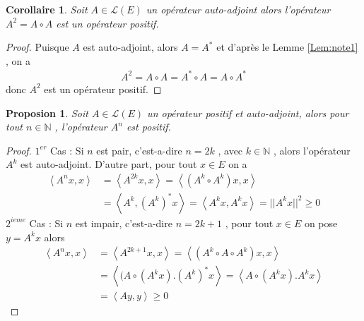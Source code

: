 \documentclass{report}
\newtheorem{Prop}{Proposion}[subsection]
\newtheorem{Cor}{Corollaire}[subsection]
\begin{document}
{\begin{Cor} Soit $A \in \mathscr{L}(E)$ un opérateur auto-adjoint alors l'opérateur $A^2 = A\circ A$ est un opérateur positif.\\
\end{Cor}
\begin{proof}


Puisque $A$ est auto-adjoint, alors $A = A^*$ et d'après le Lemme \ref{Lem:note1} , on a 
					\begin{align*}
					 A^2 = A \circ A = A^* \circ A = A\circ A^* 
					\end{align*}
donc $A^2$ est un opérateur positif.
\end{proof}


\begin{Prop} Soit $A \in \mathscr{L}(E)$ un opérateur positif et auto-adjoint, alors pour tout $n \in \mathbb{N}$ , l'opérateur $A^n$ est positif.\\
\end{Prop}
\begin{proof}
$1^{er}$ Cas : Si $n$ est pair, c'est-a-dire $n = 2k$ , avec $k \in \mathbb{N}$ , alors l'opérateur $A^k$ est auto-adjoint. D'autre part, pour tout $x \in E$ on a 
 					\begin{align*}
					 \left< A^nx,x \right> &= \left< A^{2k}x,x \right> = \left< (A^k\circ A^k)x,x \right> \\
					 &= \left< A^k,(A^k)^*x \right> = \left< A^kx,A^kx \right> = ||A^kx||^2 \ge 0
					\end{align*}
 $2^{ieme}$ Cas : Si $n$ est impair, c'est-a-dire $n = 2k + 1$ , pour tout $x \in E$ on pose $y = A^k x$ alors 
 					\begin{align*}
 					  \left< A^nx,x \right> &= \left< A^{2k+1}x,x \right> = \left< (A^k\circ A \circ A^k)x,x \right> \\
 					 &= \left< (A\circ (A^kx).(A^k)^*x \right> = \left< A\circ(A^kx).A^kx \right> \\
 					 &= \left< Ay,y \right> \ge 0
 					\end{align*}
\end{proof}
 

}
\end{document}
